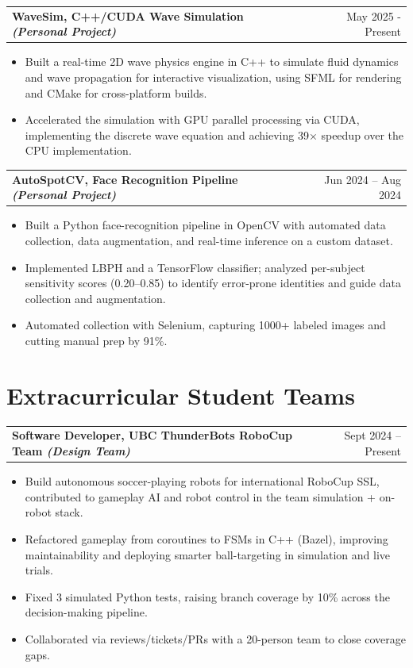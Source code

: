 \documentclass[a4paper,11pt]{article}
\makeatletter
\newenvironment{joblong}[2]
    {
    \begin{tabularx}{\linewidth}{@{}l X r@{}}
    \textbf{#1} & \hfill &  #2 \\[3.75pt]
    \end{tabularx}
    \begin{minipage}[t]{\linewidth}
    \begin{itemize}[nosep,after=\strut, leftmargin=1em, itemsep=3pt,label=--]
    }
    {
    \end{itemize}
    \end{minipage}    
    }
\makeatother
\begin{document}
\begin{joblong}{WaveSim, C++/CUDA Wave Simulation \textit{(Personal Project)}}{May 2025 - Present}
\item Built a real-time 2D wave physics engine in C++ to simulate fluid dynamics and wave propagation for interactive visualization, using SFML for rendering and CMake for cross-platform builds.
\item Accelerated the simulation with GPU parallel processing via CUDA, implementing the discrete wave equation and achieving 39× speedup over the CPU implementation.
\end{joblong}

\begin{joblong}{AutoSpotCV, Face Recognition Pipeline \textit{(Personal Project)}}{Jun 2024 -- Aug 2024}
\item Built a Python face-recognition pipeline in OpenCV with automated data collection, data augmentation, and real-time inference on a custom dataset.
  \item Implemented LBPH and a TensorFlow classifier; analyzed per-subject sensitivity scores (0.20--0.85) to identify error-prone identities and guide data collection and augmentation.
  \item Automated collection with Selenium, capturing 1000+ labeled images and cutting manual prep by 91\%.
\end{joblong}





\section{Extracurricular Student Teams}

\begin{joblong}{Software Developer, UBC ThunderBots RoboCup Team \textit{(Design Team)}}{Sept 2024 -- Present}
\item Build autonomous soccer-playing robots for international RoboCup SSL, contributed to gameplay AI and robot control in the team simulation + on-robot stack.
\item Refactored gameplay from coroutines to FSMs in C++ (Bazel), improving maintainability and deploying smarter ball-targeting in simulation and live trials.
\item Fixed 3 simulated Python tests, raising branch coverage by 10\% across the decision-making pipeline.
\item Collaborated via reviews/tickets/PRs with a 20-person team to close coverage gaps.
\end{joblong}
\end{document}
